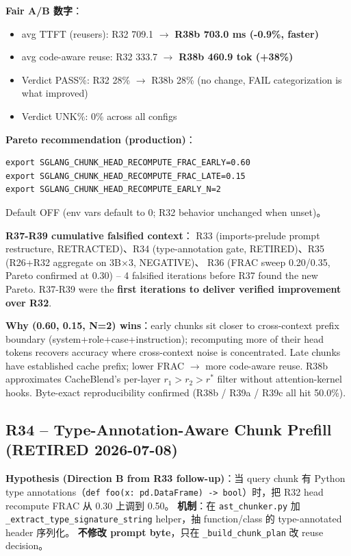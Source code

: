 \documentclass[11pt,a4paper]{article}
\begin{document}
\begin{itemize}
\textbf{Fair A/B 数字}：
\begin{itemize}
  \item avg TTFT (reusers): R32 709.1 $\to$ \textbf{R38b 703.0 ms (-0.9\%, faster)}
  \item avg code-aware reuse: R32 333.7 $\to$ \textbf{R38b 460.9 tok (+38\%)}
  \item Verdict PASS\%: R32 28\% $\to$ R38b 28\% (no change, FAIL categorization is what improved)
  \item Verdict UNK\%: 0\% across all configs
\end{itemize}

\textbf{Pareto recommendation (production)}：
\begin{verbatim}
export SGLANG_CHUNK_HEAD_RECOMPUTE_FRAC_EARLY=0.60
export SGLANG_CHUNK_HEAD_RECOMPUTE_FRAC_LATE=0.15
export SGLANG_CHUNK_HEAD_RECOMPUTE_EARLY_N=2
\end{verbatim}
Default OFF (env vars default to 0; R32 behavior unchanged when unset)。

\textbf{R37-R39 cumulative falsified context}：
R33 (imports-prelude prompt restructure, RETRACTED)、R34 (type-annotation
gate, RETIRED)、R35 (R26+R32 aggregate on 3B×3, NEGATIVE)、
R36 (FRAC sweep 0.20/0.35, Pareto confirmed at 0.30) -- 4 falsified
iterations before R37 found the new Pareto. R37-R39 were the
\textbf{first iterations to deliver verified improvement over R32}.

\textbf{Why (0.60, 0.15, N=2) wins}：early chunks sit closer to cross-context
prefix boundary (system+role+case+instruction); recomputing more of
their head tokens recovers accuracy where cross-context noise is
concentrated. Late chunks have established cache prefix; lower FRAC
$\to$ more code-aware reuse. R38b approximates CacheBlend's per-layer
$r_1 > r_2 > r^*$ filter without attention-kernel hooks.
Byte-exact reproducibility confirmed (R38b / R39a / R39c all hit
50.0\%).

\subsection*{R34 -- Type-Annotation-Aware Chunk Prefill \textbf{(RETIRED 2026-07-08)}}

\textbf{Hypothesis (Direction B from R33 follow-up)}：当 query chunk 有 Python
type annotations（\texttt{def foo(x: pd.DataFrame) -> bool}）时，把 R32 head
recompute FRAC 从 0.30 上调到 0.50。
\textbf{机制}：在 \texttt{ast\_chunker.py} 加 \texttt{\_extract\_type\_signature\_string}
helper，抽 function/class 的 type-annotated header 序列化。
\textbf{不修改 prompt byte}，只在 \texttt{\_build\_chunk\_plan} 改 reuse decision。


\end{itemize}
\end{document}
